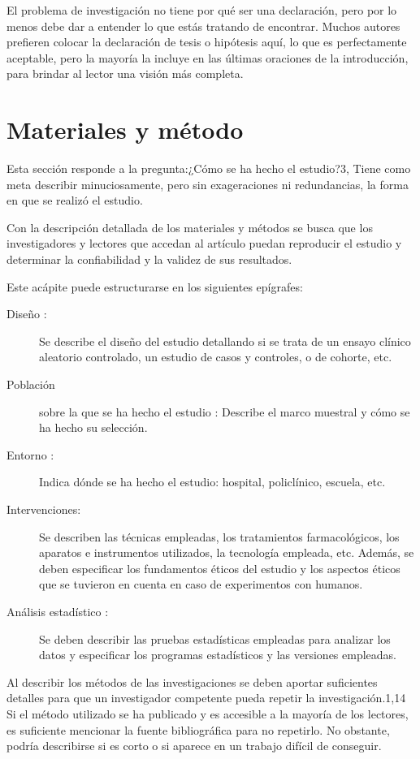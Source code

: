 \documentclass[%
 reprint,
groupedaddress,
unsortedaddress,
 amsmath,amssymb,
 aps,
superscriptaddress
]{revtex4-2}
\begin{document}
El problema de investigación no tiene por qué ser una declaración, pero por lo menos debe 
dar a entender lo que estás tratando de encontrar.
Muchos autores prefieren colocar la declaración de tesis o hipótesis aquí, lo que es 
perfectamente aceptable, pero la mayoría la incluye en las últimas oraciones de la 
introducción, para brindar al lector una visión más completa.

\section{Materiales y método}
\label{sec:met}

Esta sección responde a la pregunta:¿Cómo se ha hecho el estudio?3, Tiene como meta 
describir minuciosamente, pero sin exageraciones ni redundancias, la forma en que se 
realizó el estudio.

Con la descripción detallada de los materiales y métodos se busca que los investigadores 
y lectores que accedan al artículo puedan reproducir el estudio y determinar la 
confiabilidad y la validez de sus resultados.

Este acápite puede estructurarse en los siguientes epígrafes:
\begin{description}
	\item[Diseño :]  Se describe el diseño del estudio detallando si se trata de un 
	ensayo 
	clínico aleatorio controlado, un estudio de casos y controles, o de cohorte, etc.
	\item[Población]  sobre la que se ha hecho el estudio : Describe el marco muestral y 
	cómo 
	se ha hecho su selección.
	\item[Entorno :]  Indica dónde se ha hecho el estudio: hospital, policlínico, 
	escuela, 
	etc.
	\item[Intervenciones:]  Se describen las técnicas empleadas, los tratamientos 
	farmacológicos, los aparatos e instrumentos utilizados, la tecnología empleada, etc. 
	Además, se deben especificar los fundamentos éticos del estudio y los aspectos éticos 
	que 
	se tuvieron en cuenta en caso de experimentos con humanos.
	\item[Análisis estadístico :]  Se deben describir las pruebas estadísticas empleadas 
	para 
	analizar los datos y especificar los programas estadísticos y las versiones empleadas.
\end{description}

Al describir los métodos de las investigaciones se deben aportar suficientes detalles 
para que un investigador competente pueda repetir la investigación.1,14 Si el método 
utilizado se ha publicado y es accesible a la mayoría de los lectores, es suficiente 
mencionar la fuente bibliográfica para no repetirlo. No obstante, podría describirse si 
es corto o si aparece en un trabajo difícil de conseguir. 
\end{document}
